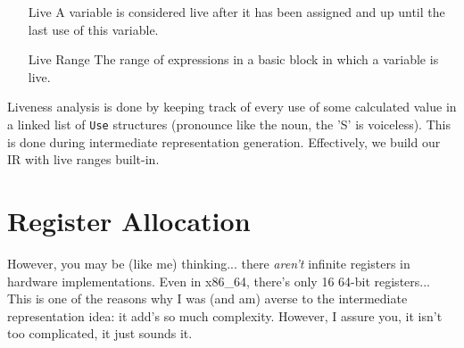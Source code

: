 \documentclass[12pt]{report}
\begin{document}
\begin{itemize}
\item[Live]
  A variable is considered live after it has been assigned and up until the last use of this variable.
\item[Live Range]
  The range of expressions in a basic block in which a variable is live.
\end{itemize}

Liveness analysis is done by keeping track of every use of some calculated value in a linked list of \verb|Use| structures (pronounce like the noun, the 'S' is voiceless). This is done during intermediate representation generation. Effectively, we build our IR with live ranges built-in.









\section{Register Allocation}
\label{sec:codegen-register-allocation}


However, you may be (like me) thinking... there \emph{\emph{aren't}} infinite registers in hardware implementations. Even in x86\_64, there's only 16 64-bit registers... This is one of the reasons why I was (and am) averse to the intermediate representation idea: it add's so much complexity. However, I assure you, it isn't too complicated, it just sounds it.

\end{document}
